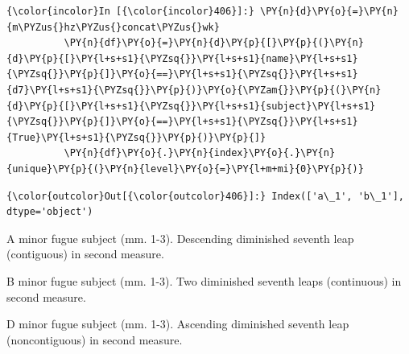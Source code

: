     \begin{Verbatim}[commandchars=\\\{\}]
{\color{incolor}In [{\color{incolor}406}]:} \PY{n}{d}\PY{o}{=}\PY{n}{m\PYZus{}hz\PYZus{}concat\PYZus{}wk}
          \PY{n}{df}\PY{o}{=}\PY{n}{d}\PY{p}{[}\PY{p}{(}\PY{n}{d}\PY{p}{[}\PY{l+s+s1}{\PYZsq{}}\PY{l+s+s1}{name}\PY{l+s+s1}{\PYZsq{}}\PY{p}{]}\PY{o}{==}\PY{l+s+s1}{\PYZsq{}}\PY{l+s+s1}{d7}\PY{l+s+s1}{\PYZsq{}}\PY{p}{)}\PY{o}{\PYZam{}}\PY{p}{(}\PY{n}{d}\PY{p}{[}\PY{l+s+s1}{\PYZsq{}}\PY{l+s+s1}{subject}\PY{l+s+s1}{\PYZsq{}}\PY{p}{]}\PY{o}{==}\PY{l+s+s1}{\PYZsq{}}\PY{l+s+s1}{True}\PY{l+s+s1}{\PYZsq{}}\PY{p}{)}\PY{p}{]}
          \PY{n}{df}\PY{o}{.}\PY{n}{index}\PY{o}{.}\PY{n}{unique}\PY{p}{(}\PY{n}{level}\PY{o}{=}\PY{l+m+mi}{0}\PY{p}{)}
\end{Verbatim}
\begin{Verbatim}[commandchars=\\\{\}]
{\color{outcolor}Out[{\color{outcolor}406}]:} Index(['a\_1', 'b\_1'], dtype='object')
\end{Verbatim}


\begin{Example}[H]
    \begin{center}
    \caption[Diminished seventh leap in a minor fugue subject (mm. 1-3). ]{ A minor fugue subject (mm. 1-3). Descending diminished seventh leap (contiguous) in second measure.}
    \end{center}
\end{Example}
    


\begin{Example}[H]
    \begin{center}
    \caption[Diminished seventh leap in b minor fugue subject (mm. 1-3). ]{ B minor fugue subject (mm. 1-3). Two diminished seventh leaps (continuous) in second measure.}
    \end{center}
\end{Example}
    


\begin{Example}[H]
    \begin{center}
    \caption[Diminished seventh leap (noncontiguous) in d minor fugue subject (mm. 1-3). ]{ D minor fugue subject (mm. 1-3). Ascending diminished seventh leap (noncontiguous) in second measure.}
    \end{center}
\end{Example}
    


